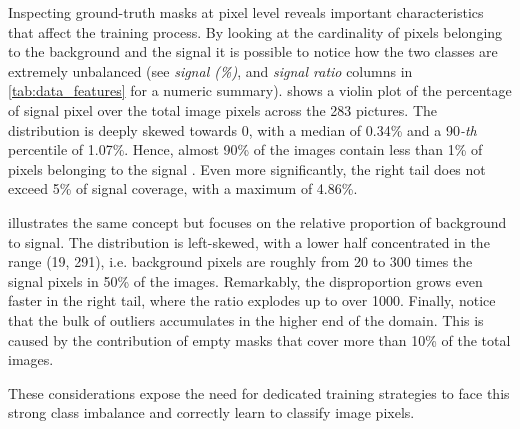 Inspecting ground-truth masks at pixel level reveals important characteristics that affect the training process. 
By looking at the cardinality of pixels belonging to the background and the signal it is possible to notice how the two classes are extremely unbalanced (see \textit{signal (\%)}, and \textit{signal ratio} columns in \cref{tab:data_features} for a numeric summary).
 shows a violin plot of the percentage of signal pixel over the total image pixels across the 283 pictures.
The distribution is deeply skewed towards 0, with a median of 0.34\% and a 90\emph{-th} percentile of 1.07\%. 
Hence, almost 90\% of the images contain less than 1\% of pixels belonging to the signal%
.
Even more significantly, the right tail does not exceed 5\% of signal coverage, with a maximum of 4.86\%.

 illustrates the same concept but focuses on the relative proportion of background to signal. 
The distribution is left-skewed, with a lower half concentrated in the range (19, 291), i.e. background pixels are roughly from 20 to 300 times the signal pixels in 50\% of the images.
Remarkably, the disproportion grows even faster in the right tail, where the ratio explodes up to over 1000. 
Finally, notice that the bulk of outliers accumulates in the higher end of the domain. 
This is caused by the contribution of empty masks that cover more than 10\% of the total images.

These considerations expose the need for dedicated training strategies to face this strong class imbalance and correctly learn to classify image pixels.
